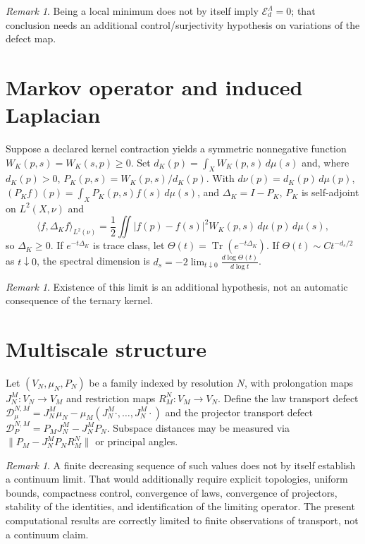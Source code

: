 \documentclass[11pt]{amsart}
\theoremstyle{definition}
\theoremstyle{remark}
\newtheorem{remark}[theorem]{Remark}
\DeclareMathOperator{\Tr}{Tr}
\begin{document}
\begin{remark}
Being a local minimum does not by itself imply
$\mathcal E_d^\Lambda=0$; that conclusion needs an additional
control/surjectivity hypothesis on variations of the defect map.
\end{remark}

\section{Markov operator and induced Laplacian}

Suppose a declared kernel contraction yields a symmetric nonnegative
function $W_K(p,s)=W_K(s,p)\ge0$. Set
$d_K(p)=\int_X W_K(p,s)\,d\mu(s)$ and, where $d_K(p)>0$,
$P_K(p,s)=W_K(p,s)/d_K(p)$. With $d\nu(p)=d_K(p)\,d\mu(p)$,
$(P_Kf)(p)=\int_X P_K(p,s)f(s)\,d\mu(s)$, and $\Delta_K = I-P_K$,
$P_K$ is self-adjoint on $L^2(X,\nu)$ and
\[
\langle f,\Delta_K f\rangle_{L^2(\nu)}
= \frac12\iint \lvert f(p)-f(s)\rvert^2 W_K(p,s)\,d\mu(p)\,d\mu(s),
\]
so $\Delta_K\ge0$. If $e^{-t\Delta_K}$ is trace class, let
$\Theta(t)=\Tr(e^{-t\Delta_K})$. If $\Theta(t)\sim Ct^{-d_s/2}$ as
$t\downarrow0$, the spectral dimension is
$d_s = -2\lim_{t\downarrow0}\tfrac{d\log\Theta(t)}{d\log t}$.

\begin{remark}
Existence of this limit is an additional hypothesis, not an automatic
consequence of the ternary kernel.
\end{remark}

\section{Multiscale structure}
\label{sec:xxiv}

Let $(V_N,\mu_N,P_N)$ be a family indexed by resolution $N$, with
prolongation maps $J_N^M:V_N\to V_M$ and restriction maps
$R_M^N:V_M\to V_N$. Define the law transport defect
$\mathcal D_\mu^{N,M} = J_N^M\mu_N - \mu_M(J_N^M\cdot,\ldots,J_N^M\cdot)$
and the projector transport defect
$\mathcal D_P^{N,M} = P_MJ_N^M - J_N^MP_N$. Subspace distances may be
measured via $\lVert P_M - J_N^MP_NR_M^N\rVert$ or principal angles.

\begin{remark}
A finite decreasing sequence of such values does not by itself
establish a continuum limit. That would additionally require explicit
topologies, uniform bounds, compactness control, convergence of laws,
convergence of projectors, stability of the identities, and
identification of the limiting operator. The present computational
results are correctly limited to finite observations of transport, not
a continuum claim.
\end{remark}
\end{document}
